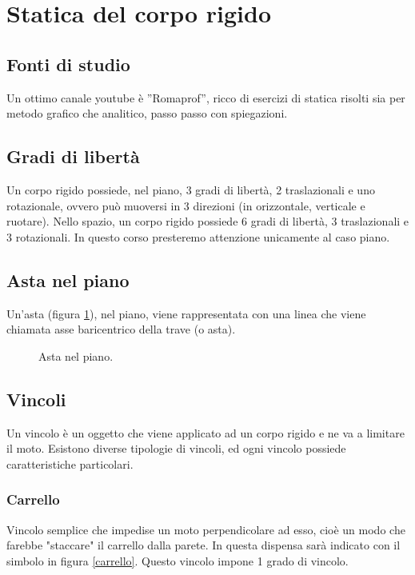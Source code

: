 \documentclass[main.tex]{subfiles}
\begin{document}
\section{Statica del corpo rigido}

\subsection{Fonti di studio}
Un ottimo canale youtube è ”Romaprof”, ricco di esercizi di statica risolti sia per metodo grafico che analitico, passo passo con spiegazioni.

\subsection{Gradi di libertà}
Un corpo rigido possiede, nel piano, 3 gradi di libertà, 2 traslazionali e uno rotazionale, ovvero può muoversi in 3 direzioni (in orizzontale, verticale e ruotare). Nello spazio, un corpo rigido possiede 6 gradi di libertà, 3 traslazionali e 3 rotazionali. In questo corso presteremo attenzione unicamente al caso piano.

\subsection{Asta nel piano}
Un’asta (figura \ref{asta_piano}), nel piano, viene rappresentata con una linea che viene chiamata asse baricentrico della trave (o asta).

\begin{figure}[H]
  \centering
  \resizebox{0.5\textwidth}{!}{}
  \caption{Asta nel piano.}
  \label{asta_piano}
\end{figure}

\subsection{Vincoli}
Un vincolo è un oggetto che viene applicato ad un corpo rigido e ne va a limitare il moto. Esistono diverse tipologie di vincoli, ed ogni vincolo possiede caratteristiche particolari.

\subsubsection{Carrello}
Vincolo semplice che impedise un moto perpendicolare ad esso, cioè un modo che farebbe "staccare" il carrello dalla parete. In questa dispensa sarà indicato con il simbolo in figura \ref{carrello}. Questo vincolo impone 1 grado di vincolo.
\end{document}
